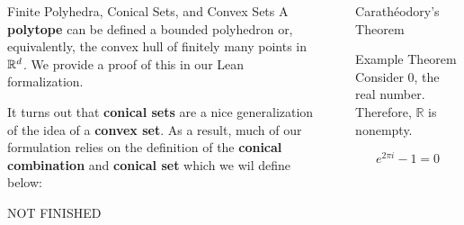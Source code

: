 \documentclass[final]{beamer}
\newlength{\sepwidth}
\newlength{\colwidth}
\newcommand{\separatorcolumn}{\begin{column}{\sepwidth}\end{column}}
\begin{document}
\begin{frame}[fragile]
\begin{columns}[t]
\begin{column}{\colwidth}
\begin{block}{Finite Polyhedra, Conical Sets, and Convex Sets}
                A \textbf{polytope} can be defined a bounded polyhedron or, equivalently, the convex hull of finitely many points in $\mathbb{R}^d$. We provide a proof of this in our Lean formalization. 
                
                It turns out that \textbf{conical sets} are a nice generalization of the idea of a \textbf{convex set}. As a result, much of our formulation relies on the definition of the \textbf{conical combination} and \textbf{conical set} which we wil define below:
                
                NOT FINISHED
                               
            \end{block}
           
            
        \end{column}

        \separatorcolumn

        \begin{column}{\colwidth}

            \begin{block*}


            \end{block*}

            \begin{block}{Carath\'eodory's Theorem}

                \begin{alertblock}{Example Theorem}
                    Consider 0, the real number. Therefore, $\mathbb{R}$ is nonempty. 
                \end{alertblock}

                \begin{equation}
                    e^{2\pi i} - 1 = 0
                \end{equation}


\end{block}
\end{column}
\end{columns}
\end{frame}
\end{document}
